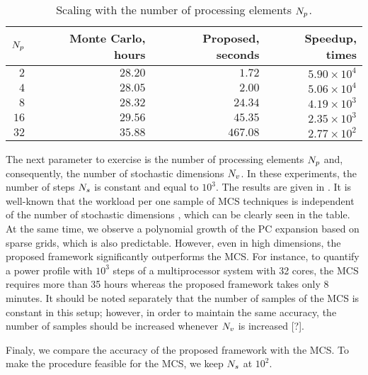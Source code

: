 \begin{table}
  \centering
  \caption{Scaling with the number of processing elements ${N_p}$.}
  \vspace{-10pt}
  \begin{tabular}{|r|r|r|r|}
    \hline
    ${N_p}$ & Monte Carlo, hours & Proposed, seconds & Speedup, times \\
    \hline
    $ 2$ & $28.20$ & $  1.72$ & $5.90 \times 10^4$ \\
    $ 4$ & $28.05$ & $  2.00$ & $5.06 \times 10^4$ \\
    $ 8$ & $28.32$ & $ 24.34$ & $4.19 \times 10^3$ \\
    $16$ & $29.56$ & $ 45.35$ & $2.35 \times 10^3$ \\
    $32$ & $35.88$ & $467.08$ & $2.77 \times 10^2$ \\
    \hline
  \end{tabular}
  \vspace{-10pt}
\end{table}
The next parameter to exercise is the number of processing elements ${N_p}$ and, consequently, the number of stochastic dimensions ${N_v}$. In these experiments, the number of steps ${N_s}$ is constant and equal to $10^3$. The results are given in . It is well-known that the workload per one sample of MCS techniques is independent of the number of stochastic dimensions \cite{poette2012}, which can be clearly seen in the table. At the same time, we observe a polynomial growth \cite{heiss2008} of the PC expansion based on sparse grids, which is also predictable. However, even in high dimensions, the proposed framework significantly outperforms the MCS. For instance, to quantify a power profile with $10^3$ steps of a multiprocessor system with 32 cores, the MCS requires more than 35 hours whereas the proposed framework takes only 8 minutes. It should be noted separately that the number of samples of the MCS is constant in this setup; however, in order to maintain the same accuracy, the number of samples should be increased whenever ${N_v}$ is increased [?].

Finaly, we compare the accuracy of the proposed framework with the MCS. To make the procedure feasible for the MCS, we keep ${N_s}$ at $10^2$.
